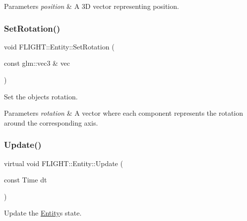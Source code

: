 \begin{DoxyParams}{Parameters}
{\em position} & A 3D vector representing position. \\
\hline
\end{DoxyParams}
\mbox{\label{class_f_l_i_g_h_t_1_1_entity_acae0369a4dfcc8c4d147d218eacb7423}} 
\subsubsection{\texorpdfstring{Set\+Rotation()}{SetRotation()}}
{\footnotesize\ttfamily void F\+L\+I\+G\+H\+T\+::\+Entity\+::\+Set\+Rotation (\begin{DoxyParamCaption}\item[{const glm\+::vec3 \&}]{vec }\end{DoxyParamCaption})}



Set the object\textquotesingle{}s rotation. 


\begin{DoxyParams}{Parameters}
{\em rotation} & A vector where each component represents the rotation around the corresponding axis. \\
\hline
\end{DoxyParams}
\mbox{\label{class_f_l_i_g_h_t_1_1_entity_afb03ab9c3239e0651101cc3103c7c503}} 
\subsubsection{\texorpdfstring{Update()}{Update()}}
{\footnotesize\ttfamily virtual void F\+L\+I\+G\+H\+T\+::\+Entity\+::\+Update (\begin{DoxyParamCaption}\item[{const Time}]{dt }\end{DoxyParamCaption})\hspace{0.3cm}{\ttfamily [pure virtual]}}



Update the \hyperlink{class_f_l_i_g_h_t_1_1_entity}{Entity}\textquotesingle{}s state. 


